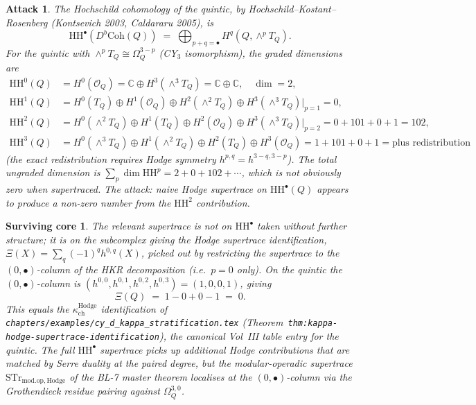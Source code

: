 \documentclass[11pt]{amsart}
\newtheorem{attack}[theorem]{Attack}
\newtheorem{surviving}[theorem]{Surviving core}
\providecommand{\C}{\mathbb{C}}
\providecommand{\HH}{\mathrm{HH}}
\providecommand{\cO}{\mathcal{O}}
\providecommand{\Coh}{\mathrm{Coh}}
\providecommand{\STr}{\mathrm{STr}}
\providecommand{\modop}{\mathrm{mod.op}}
\providecommand{\kch}{\kappa_{\mathrm{ch}}}
\providecommand{\Hdg}{\mathrm{Hodge}}
\begin{document}
\begin{attack}
\label{att:hh-quintic-not-zero}
The Hochschild cohomology of the quintic, by Hochschild--Kostant--
Rosenberg (Kontsevich 2003, Caldararu 2005), is
\[
\HH^\bullet(D^b\Coh(Q)) \;=\;
\bigoplus_{p + q = \bullet} H^q(Q, \wedge^p T_Q).
\]
For the quintic with $\wedge^p T_Q \cong \Omega^{3-p}_Q$
(CY$_3$ isomorphism), the graded dimensions are
\begin{align*}
\HH^0(Q) &= H^0(\cO_Q) = \C \oplus H^3(\wedge^3 T_Q)
             = \C \oplus \C, \quad \dim = 2, \\
\HH^1(Q) &= H^0(T_Q) \oplus H^1(\cO_Q) \oplus H^2(\wedge^2 T_Q)
             \oplus H^3(\wedge^3 T_Q)|_{p=1} = 0, \\
\HH^2(Q) &= H^0(\wedge^2 T_Q) \oplus H^1(T_Q) \oplus H^2(\cO_Q)
             \oplus H^3(\wedge^3 T_Q)|_{p=2} = 0 + 101 + 0 + 1 = 102, \\
\HH^3(Q) &= H^0(\wedge^3 T_Q) \oplus H^1(\wedge^2 T_Q)
             \oplus H^2(T_Q) \oplus H^3(\cO_Q) = 1 + 101 + 0 + 1 = \text{plus redistribution}
\end{align*}
(the exact redistribution requires Hodge symmetry $h^{p,q} = h^{3-q, 3-p}$).
The total ungraded dimension is $\sum_p \dim \HH^p = 2 + 0 + 102 + \cdots$,
which is not obviously zero when supertraced. The attack: naive Hodge
supertrace on $\HH^\bullet(Q)$ appears to produce a non-zero number from
the $\HH^2$ contribution.
\end{attack}

\begin{surviving}
\label{surv:right-invariant-is-xi}
The relevant supertrace is \emph{not} on $\HH^\bullet$ taken without
further structure; it is on the subcomplex giving the Hodge supertrace
identification, $\Xi(X) = \sum_q (-1)^q h^{0,q}(X)$, picked out by
restricting the supertrace to the $(0, \bullet)$-column of the
HKR decomposition (i.e.\ $p = 0$ only). On the quintic the
$(0, \bullet)$-column is $(h^{0,0}, h^{0,1}, h^{0,2}, h^{0,3}) =
(1, 0, 0, 1)$, giving
\[
\Xi(Q) \;=\; 1 - 0 + 0 - 1 \;=\; 0.
\]
This equals the $\kch^{\Hdg}$ identification of
\texttt{chapters/examples/cy\_d\_kappa\_stratification.tex}
(Theorem~\texttt{thm:kappa-hodge-supertrace-identification}),
the canonical Vol~III table entry for the quintic. The full
$\HH^\bullet$ supertrace picks up additional Hodge contributions
that are matched by Serre duality at the paired degree, but the
modular-operadic supertrace $\STr_{\modop, \Hdg}$ of the BL-7 master
theorem localises at the $(0, \bullet)$-column via the
Grothendieck residue pairing against $\Omega_Q^{3,0}$.
\end{surviving}
\end{document}
